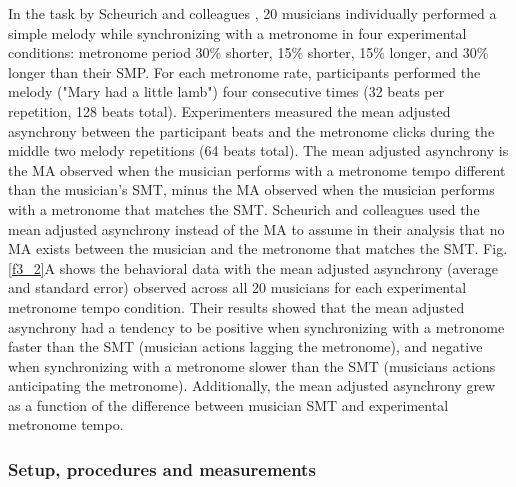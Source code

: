 \documentclass{report}
\begin{document}
In the task by Scheurich and colleagues \cite{scheurich2018tapping}, 20 musicians individually performed a simple melody while synchronizing with a metronome in four experimental conditions: metronome period 30\% shorter, 15\% shorter, 15\% longer, and 30\% longer than their SMP. For each metronome rate, participants performed the melody ("Mary had a little lamb") four consecutive times (32 beats per repetition, 128 beats total). Experimenters measured the mean adjusted asynchrony between the participant beats and the metronome clicks during the middle two melody repetitions (64 beats total). The mean adjusted asynchrony is the MA observed when the musician performs with a metronome tempo different than the musician's SMT, minus the MA observed when the musician performs with a metronome that matches the SMT. Scheurich and colleagues \cite{scheurich2018tapping} used the mean adjusted asynchrony instead of the MA to assume in their analysis that no MA exists between the musician and the metronome that matches the SMT. Fig.{} \ref{f3_2}A shows the behavioral data with the mean adjusted asynchrony (average and standard error) observed across all 20 musicians for each experimental metronome tempo condition. Their results showed that the mean adjusted asynchrony had a tendency to be positive when synchronizing with a metronome faster than the SMT (musician actions lagging the metronome), and negative when synchronizing with a metronome slower than the SMT (musicians actions anticipating the metronome). Additionally, the mean adjusted asynchrony grew as a function of the difference between musician SMT and experimental metronome tempo.

\subsubsection{Setup, procedures and measurements} 
\end{document}
